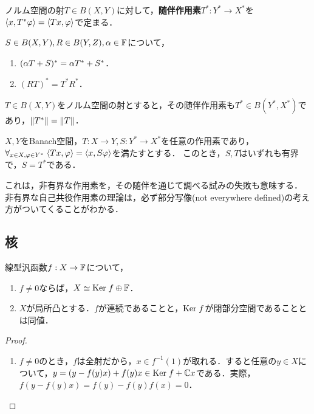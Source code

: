 \documentclass[uplatex,dvipdfmx]{jsreport}
\begin{document}
\begin{definition}
    ノルム空間の射$T\in B(X,Y)$に対して，\textbf{随伴作用素}$T^*:Y^*\to X^*$を$\langle x,T^*\varphi\rangle=\langle Tx,\varphi\rangle$で定まる．
\end{definition}

\begin{lemma}[$*$-作用素の関手性]
    $S\in B(X,Y),R\in B(Y,Z),\alpha\in\mathbb{F}$について，
    \begin{enumerate}
        \item $(\alpha T+S)^*=\alpha T^*+S^*$．
        \item $(RT)^*=T^*R^*$．
    \end{enumerate}
\end{lemma}

\begin{proposition}[$*$-作用素の等長性]
    $T\in B(X,Y)$をノルム空間の射とすると，その随伴作用素も$T^*\in B(Y^*,X^*)$であり，$\|T^*\|=\|T\|$．
\end{proposition}

\begin{proposition}[随伴であるための十分条件]
    $X,Y$をBanach空間，$T:X\to Y,S:Y^*\to X^*$を任意の作用素であり，\\
    $\forall_{x\in X,\varphi\in Y^*}\;\langle Tx,\varphi\rangle=\langle x,S\varphi\rangle$を満たすとする．
    このとき，$S,T$はいずれも有界で，$S=T^*$である．
\end{proposition}
\begin{remarks}
    これは，非有界な作用素を，その随伴を通じて調べる試みの失敗も意味する．
    非有界な自己共役作用素の理論は，必ず部分写像(not everywhere defined)の考え方がついてくることがわかる．
\end{remarks}

\subsection{核}

\begin{proposition}
    線型汎函数$f:X\to\mathbb{F}$について，
    \begin{enumerate}
        \item $f\ne 0$ならば，$X\simeq\mathrm{Ker}\; f\oplus\mathbb{F}$．
        \item $X$が局所凸とする．$f$が連続であることと，$\mathrm{Ker}\; f$が閉部分空間であることとは同値．
    \end{enumerate}
\end{proposition}
\begin{proof}\mbox{}
    \begin{enumerate}
        \item $f\ne 0$のとき，$f$は全射だから，$x\in f^{-1}(1)$が取れる．すると任意の$y\in X$について，$y=(y-f(y)x)+f(y)x\in\mathrm{Ker}\; f+\mathbb{C} x$である．実際，$f(y-f(y)x)=f(y)-f(y)f(x)=0$．
    \end{enumerate}
\end{proof}
\end{document}
